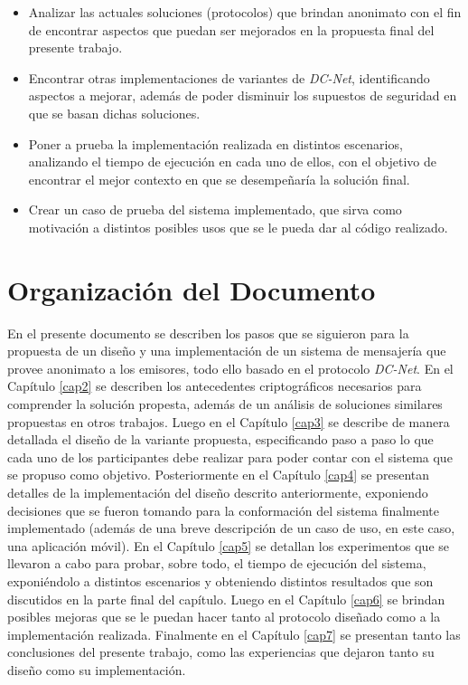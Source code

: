\begin{itemize}
    \item Analizar las actuales soluciones (protocolos) que brindan anonimato con el fin de encontrar aspectos que puedan ser mejorados en la propuesta 
    final del presente trabajo.
    \item Encontrar otras implementaciones de variantes de \emph{DC-Net}, identificando aspectos a mejorar, además de poder disminuir los supuestos de 
    seguridad en que se basan dichas soluciones.
    \item Poner a prueba la implementación realizada en distintos escenarios, analizando el tiempo de ejecución en cada uno de ellos, con el objetivo 
    de encontrar el mejor contexto en que se desempeñaría la solución final.
    \item Crear un caso de prueba del sistema implementado, que sirva como motivación a distintos posibles usos que se le pueda dar al código realizado.
\end{itemize}

\section{Organización del Documento}

En el presente documento se describen los pasos que se siguieron para la propuesta de un diseño y una implementación de un sistema de mensajería que 
provee anonimato a los emisores, todo ello basado en el protocolo \emph{DC-Net}. En el Capítulo \ref{cap2} se describen los antecedentes criptográficos 
necesarios para comprender la solución propesta, además de un análisis de soluciones similares propuestas en otros trabajos. Luego en el Capítulo \ref{cap3} 
se describe de manera detallada el diseño de la variante propuesta, especificando paso a paso lo que cada uno de los participantes debe realizar 
para poder contar con el sistema que se propuso como objetivo. Posteriormente en el Capítulo \ref{cap4} se presentan detalles de la implementación del diseño 
descrito anteriormente, exponiendo decisiones que se fueron tomando para la conformación del sistema finalmente implementado (además de una breve 
descripción de un caso de uso, en este caso, una aplicación móvil). En el Capítulo \ref{cap5} se detallan los experimentos que se llevaron a cabo para probar, 
sobre todo, el tiempo de ejecución del sistema, exponiéndolo a distintos escenarios y obteniendo distintos resultados que son discutidos en la parte 
final del capítulo. Luego en el Capítulo \ref{cap6} se 
brindan posibles mejoras que se le puedan hacer tanto al protocolo diseñado como a la implementación realizada. Finalmente en el Capítulo \ref{cap7} se 
presentan tanto las conclusiones del presente trabajo, como las experiencias que dejaron tanto su diseño como su implementación.
